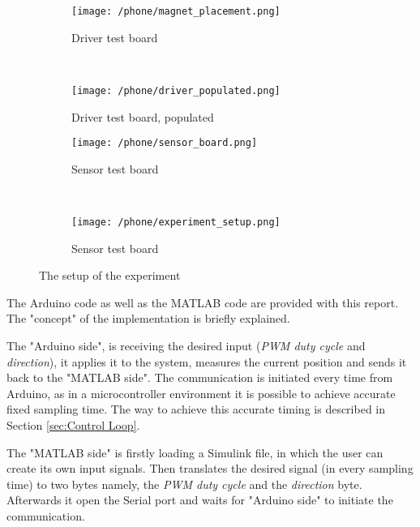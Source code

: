 \begin{figure}[h!]
    \centering
    
    \begin{subfigure}[h]{0.3\textwidth}
        \texttt{[image: /phone/magnet\_placement.png]}
        \caption{Driver test board}
        \label{Fig:magnet_placement}
    \end{subfigure}
    ~ %
    \begin{subfigure}[h]{0.3\textwidth}
        \texttt{[image: /phone/driver\_populated.png]}
        \caption{Driver test board, populated}
        \label{Fig:driver_populated}
    \end{subfigure}
    
    \begin{subfigure}[b]{0.3\textwidth}
        \texttt{[image: /phone/sensor\_board.png]}
        \caption{Sensor test board}
        \label{Fig:sensor_board}
    \end{subfigure}
	~
	\begin{subfigure}[b]{0.3\textwidth}
        \texttt{[image: /phone/experiment\_setup.png]}
        \caption{Sensor test board}
        \label{Fig:magnet+sensor}
    \end{subfigure}    
    
    \caption{The setup of the experiment}\label{Fig:experimet_setup}
\end{figure}



The Arduino code as well as the MATLAB code are provided with this report. The "concept" of the implementation is briefly explained. 

The "Arduino side", is receiving the desired input (\textit{PWM duty cycle} and \textit{direction}), it applies it to the system, measures the current position and sends it back to the "MATLAB side". The communication is initiated every time from Arduino, as in a microcontroller environment it is possible to achieve accurate fixed sampling time. The way to achieve this accurate timing is described in Section \ref{sec:Control Loop}.

The "MATLAB	side" is firstly loading a Simulink file, in which the user can create its own input signals. Then translates the desired signal (in every sampling time) to two bytes namely, the \textit{PWM duty cycle} and the \textit{direction} byte. Afterwards it open the Serial port and waits for "Arduino side" to initiate the communication.




